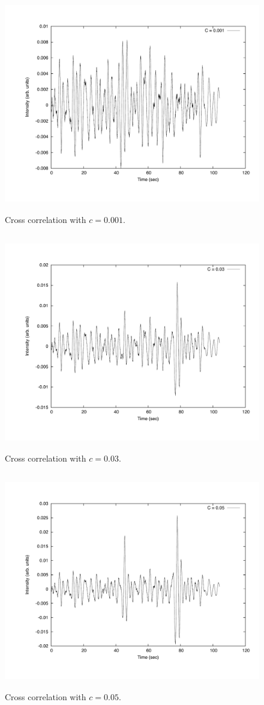 \documentclass[12pt]{article}
\begin{document}
\begin{figure}[!h]
\centering
\includegraphics[width =120 mm, height = 95mm]{Ex_6_26_cross.pdf}
\caption{Cross correlation with $c=0.001$.}
\label{fig:626}
\end{figure}
\begin{figure}[!h]
\centering
\includegraphics[width =120 mm, height = 95mm]{Ex_6_26_cross3.pdf}
\caption{Cross correlation with $c=0.03$.}
\label{fig:6263}
\end{figure}
\begin{figure}[!h]
\centering
\includegraphics[width =120 mm, height = 95mm]{Ex_6_26_cross5.pdf}
\caption{Cross correlation with $c=0.05$.}
\label{fig:6265}
\end{figure}
\end{document}
